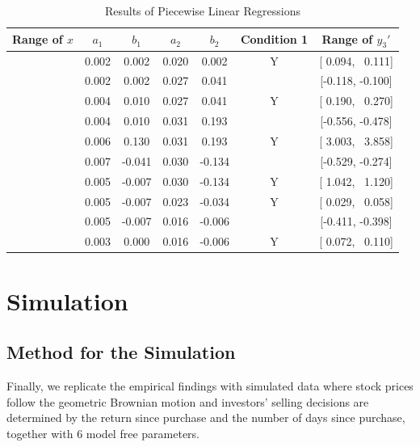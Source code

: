 \documentclass[11pt, a4paper]{article}
\begin{document}
\begin{table}[ht] %
	\centering
	\caption{Results of Piecewise Linear Regressions}
	\label{table:segment}
	\begin{tabular}{ccccccc}
		\hline
		Range of $x$ & $a_1$ & $b_1$ & $a_2$ & $b_2$ & Condition 1 & Range of $y_3'$ \\ 
		\hline
		[-0.800, -0.171] & 0.002 &  0.002 & 0.020 &  0.002 & Y & [ 0.094, ~0.111] \\ \relax
		[-0.171, -0.130] & 0.002 &  0.002 & 0.027 &  0.041 &   & [-0.118, -0.100] \\ \relax
		[-0.130, -0.030] & 0.004 &  0.010 & 0.027 &  0.041 & Y & [ 0.190, ~0.270] \\ \relax
		[-0.030, -0.019] & 0.004 &  0.010 & 0.031 &  0.193 &   & [-0.556, -0.478] \\ \relax
		[-0.019, ~0.000] & 0.006 &  0.130 & 0.031 &  0.193 & Y & [ 3.003, ~3.858] \\ \relax
		[ 0.000, ~0.063] & 0.007 & -0.041 & 0.030 & -0.134 &   & [-0.529, -0.274] \\ \relax
		[ 0.063, ~0.069] & 0.005 & -0.007 & 0.030 & -0.134 & Y & [ 1.042, ~1.120] \\ \relax
		[ 0.069, ~0.248] & 0.005 & -0.007 & 0.023 & -0.034 & Y & [ 0.029, ~0.058] \\ \relax
		[ 0.248, ~0.291] & 0.005 & -0.007 & 0.016 & -0.006 &   & [-0.411, -0.398] \\ \relax
		[ 0.291, ~0.800] & 0.003 &  0.000 & 0.016 & -0.006 & Y & [ 0.072, ~0.110] \\ 
		\hline
	\end{tabular}
\end{table}




\section{Simulation}

\subsection{Method for the Simulation}
Finally, we replicate the empirical findings with simulated data where stock prices follow the geometric Brownian motion and investors' selling decisions are determined by the return since purchase and the number of days since purchase, together with 6 model free parameters.
\end{document}
